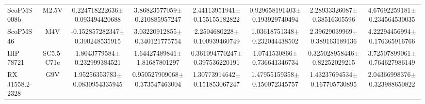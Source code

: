 \begin{table}
\begin{center}
\begin{tabular}{l|c|c|c|c|c|c|c}
ScoPMS 008b & M2.5V & 0.224718222636$\pm$0.093494420688 & 3.86823577059$\pm$0.210885957247 & 2.44113951941$\pm$0.155155182822 & 0.929658191403$\pm$0.193929740494 & 2.28933326087$\pm$0.38516305596 & 4.67692259181$\pm$0.234564530035 \\
ScoPMS 46 & M4V & -0.152857282347$\pm$0.390248535915 & 3.03220912855$\pm$0.340121775754 & 2.2504680228$\pm$0.100939460749 & 1.03618751348$\pm$0.232044438502 & 2.39629039969$\pm$0.389163189136 & 4.22294456994$\pm$0.176365916766 \\
HIP 78721 & SC5.5-C71e & 1.8043779584$\pm$0.232999384521 & 1.64427489841$\pm$1.81687801297 & 0.361094770247$\pm$0.397536220191 & 1.0741530866$\pm$0.736641346734 & 0.325028958446$\pm$0.82252029215 & 3.72507899061$\pm$0.764627986149 \\
RX J1558.2-2328 & G9V & 1.95256353783$\pm$0.0830954335945 & 0.950527909068$\pm$0.373547463004 & 1.30773914642$\pm$0.151853067247 & 1.47955159358$\pm$0.150072345757 & 1.43237694534$\pm$0.167705730895 & 2.04366998376$\pm$0.323988650822 \\
\end{tabular}
\end{center}
\end{table}
